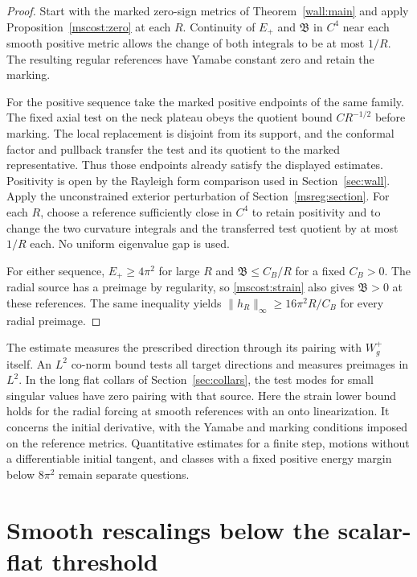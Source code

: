 \documentclass[11pt]{article}
\numberwithin{equation}{section}
\theoremstyle{definition}
\theoremstyle{remark}
\begin{document}
\begin{proof}
Start with the marked zero-sign metrics of Theorem~\ref{wall:main}
and apply Proposition~\ref{mscost:zero} at each \(R\).
Continuity of \(E_+\) and \(\mathfrak B\) in \(C^4\) near each
smooth positive metric allows the change of both integrals to be at
most \(1/R\). The resulting regular references have Yamabe constant
zero and retain the marking.

For the positive sequence take the marked positive endpoints of
the same family. The fixed axial test on the neck plateau obeys the
quotient bound \(CR^{-1/2}\) before marking. The local replacement is
disjoint from its support, and the conformal factor and pullback
transfer the test and its quotient to the marked representative.
Thus those endpoints already satisfy the displayed estimates.
Positivity is open by the Rayleigh form comparison used in
Section~\ref{sec:wall}. Apply the unconstrained exterior perturbation
of Section~\ref{msreg:section}. For each \(R\), choose a reference
sufficiently close in \(C^4\) to retain positivity and to change the
two curvature integrals and the transferred test quotient by at most
\(1/R\) each. No uniform eigenvalue gap is used.

For either sequence, \(E_+\ge4\pi^2\) for large \(R\) and
\(\mathfrak B\le C_B/R\) for a fixed \(C_B>0\). The radial source
has a preimage by regularity, so \eqref{mscost:strain} also gives
\(\mathfrak B>0\) at these references. The same inequality yields
\(\|h_R\|_\infty\ge 16\pi^2 R/C_B\) for every radial preimage.
\end{proof}

The estimate measures the prescribed direction through its pairing
with \(W_g^+\) itself. An \(L^2\) co-norm bound tests all target
directions and measures preimages in \(L^2\). In the long flat collars of
Section~\ref{sec:collars}, the test modes for small singular values
have zero pairing with that source. Here the strain lower bound
holds for the radial forcing at smooth references with an onto
linearization. It concerns the initial derivative, with the
Yamabe and marking conditions imposed on the reference metrics.
Quantitative estimates for a finite step, motions without a
differentiable initial tangent, and classes with a fixed positive
energy margin below \(8\pi^2\) remain separate questions.

\section{Smooth rescalings below the scalar-flat threshold}
\label{msale:section}
\end{document}
